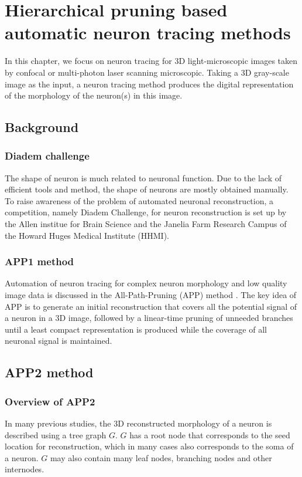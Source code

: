 \chapter{Hierarchical pruning based automatic neuron tracing methods} \label{chpt:auto-nt}
In this chapter, we focus on neuron tracing for 3D light-microscopic images taken by confocal or multi-photon laser scanning microscopic. Taking a 3D gray-scale image as the input, a neuron tracing method produces the digital representation of the morphology of the neuron(s) in this image.

\section{Background}
\subsection{Diadem challenge}
The shape of neuron is much related to neuronal function. Due to the lack of efficient tools and method, the shape of neurons are mostly obtained manually. To raise awareness of the problem of automated neuronal reconstruction, a competition, namely Diadem Challenge, for neuron reconstruction is set up by the Allen institue for Brain Science and the Janelia Farm Research Campus of the Howard Huges Medical Institute (HHMI). 
\subsection{APP1 method}
Automation of neuron tracing for complex neuron morphology and low quality image data is discussed in the All-Path-Pruning (APP) method \cite{peng2011automatic}. The key idea of APP is to generate an initial reconstruction that covers all the potential signal of a neuron in a 3D image, followed by a linear-time pruning of unneeded branches until a least compact representation is produced while the coverage of all neuronal signal is maintained.

\section{APP2 method}
\subsection{Overview of APP2}
In many previous studies, the 3D reconstructed morphology of a neuron is described using a tree graph $G$.  $G$ has a root node that corresponds to the seed location for reconstruction, which in many cases also corresponds to the soma of a neuron. $G$ may also contain many leaf nodes, branching nodes and other internodes.


